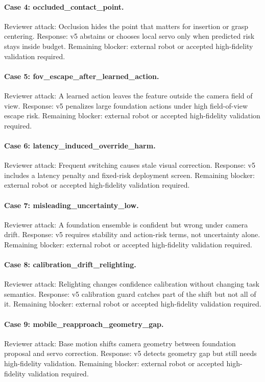 \documentclass{article}
\begin{document}
\paragraph{Case 4: occluded\_contact\_point.} Reviewer attack: Occlusion hides the point that matters for insertion or grasp centering. Response: v5 abstains or chooses local servo only when predicted risk stays inside budget. Remaining blocker: external robot or accepted high-fidelity validation required.
\paragraph{Case 5: fov\_escape\_after\_learned\_action.} Reviewer attack: A learned action leaves the feature outside the camera field of view. Response: v5 penalizes large foundation actions under high field-of-view escape risk. Remaining blocker: external robot or accepted high-fidelity validation required.
\paragraph{Case 6: latency\_induced\_override\_harm.} Reviewer attack: Frequent switching causes stale visual correction. Response: v5 includes a latency penalty and fixed-risk deployment screen. Remaining blocker: external robot or accepted high-fidelity validation required.
\paragraph{Case 7: misleading\_uncertainty\_low.} Reviewer attack: A foundation ensemble is confident but wrong under camera drift. Response: v5 requires stability and action-risk terms, not uncertainty alone. Remaining blocker: external robot or accepted high-fidelity validation required.
\paragraph{Case 8: calibration\_drift\_relighting.} Reviewer attack: Relighting changes confidence calibration without changing task semantics. Response: v5 calibration guard catches part of the shift but not all of it. Remaining blocker: external robot or accepted high-fidelity validation required.
\paragraph{Case 9: mobile\_reapproach\_geometry\_gap.} Reviewer attack: Base motion shifts camera geometry between foundation proposal and servo correction. Response: v5 detects geometry gap but still needs high-fidelity validation. Remaining blocker: external robot or accepted high-fidelity validation required.
\end{document}

